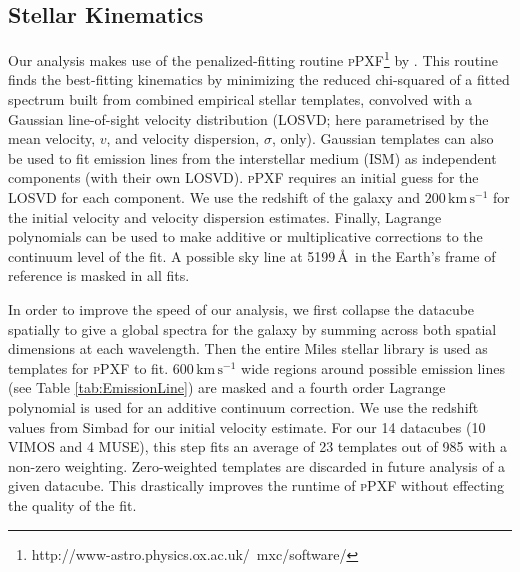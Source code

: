 	\subsection{Stellar Kinematics}
		\label{subsec:StellarFit}
		Our analysis makes use of the penalized-fitting routine \textsc{pPXF}\footnote{http://www-astro.physics.ox.ac.uk/~mxc/software/} by \citet{Cappellari2004, Cappellari2016a}. This routine finds the best-fitting kinematics by minimizing the reduced chi-squared of a fitted spectrum built from combined empirical stellar templates, convolved with a Gaussian line-of-sight velocity distribution (LOSVD; here parametrised by the mean velocity, $v$, and velocity dispersion, $\sigma$, only). Gaussian templates can also be used to fit emission lines from the interstellar medium (ISM) as independent components (with their own LOSVD). \textsc{pPXF} requires an initial guess for the LOSVD for each component. We use the redshift of the galaxy and $200\,\mathrm{km\,s^{-1}}$ for the initial velocity and velocity dispersion estimates. Finally, Lagrange polynomials can be used to make additive or multiplicative corrections to the continuum level of the fit. A possible sky line at 5199\,\AA\ in the Earth's frame of reference is masked in all fits.

		In order to improve the speed of our analysis, we first collapse the datacube spatially to give a global spectra for the galaxy by summing across both spatial dimensions at each wavelength. Then the entire Miles stellar library \citep{Sanchez-Blazquez2006, Falcon-Barroso2011a} is used as templates for \textsc{pPXF} to fit. $600\,\mathrm{km\,s^{-1}}$ wide regions around possible emission lines (see Table \ref{tab:EmissionLine}) are masked and a fourth order Lagrange polynomial is used for an additive continuum correction. We use the redshift values from Simbad \citep{Wenger2000} for our initial velocity estimate. For our 14 datacubes (10 VIMOS and 4 MUSE), this step fits an average of 23 templates out of 985 with a non-zero weighting. Zero-weighted templates are discarded in future analysis of a given datacube. This drastically improves the runtime of \textsc{pPXF} without effecting the quality of the fit.




